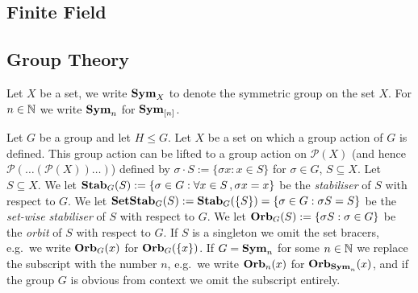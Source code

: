 \documentclass[../main/thesis.tex]{subfiles}
\begin{document}
\subsection{Finite Field}

\subsection{Group Theory}
Let $X$ be a set, we write $\text{\textbf{Sym}}_X$ to denote the symmetric group on the set
$X$. For $n \in \mathbb{N}$ we write $\text{\textbf{Sym}}_n$ for $\text{\textbf{Sym}}_{[n]}$.

Let $G$ be a group and let $H \leq G$. Let $X$ be a set on which a group action
of $G$ is defined. This group action can be lifted to a group action on
$\mathcal{P}(X)$ (and hence $\mathcal{P}(\ldots(\mathcal{P}(X))\ldots)$) defined
by $\sigma \cdot S := \{\sigma x : x \in S\}$ for $\sigma \in G$, $S \subseteq
X$. Let $S \subseteq X$. We let $\text{\textbf{Stab}}_G(S) := \{\sigma \in G : \forall x \in S
\,, \sigma x = x\}$ be the \emph{stabiliser} of $S$ with respect to $G$. We let
$\text{\textbf{SetStab}}_G(S) := \text{\textbf{Stab}}_G(\{S\}) = \{\sigma \in G : \sigma S = S\}$ be the
\emph{set-wise stabiliser} of $S$ with respect to $G$. We let $\text{\textbf{Orb}}_G(S) :=
\{\sigma S : \sigma \in G\}$ be the \emph{orbit} of $S$ with respect to $G$. If
$S$ is a singleton we omit the set bracers, e.g.\ we write $\text{\textbf{Orb}}_G(x)$ for
$\text{\textbf{Orb}}_G(\{x\})$. If $G = \text{\textbf{Sym}}_n$ for some $n \in \mathbb{N}$ we replace the subscript
with the number $n$, e.g.\ we write $\text{\textbf{Orb}}_n(x)$ for $\text{\textbf{Orb}}_{\text{\textbf{Sym}}_n}(x)$, and if
the group $G$ is obvious from context we omit the subscript entirely.
\end{document}
